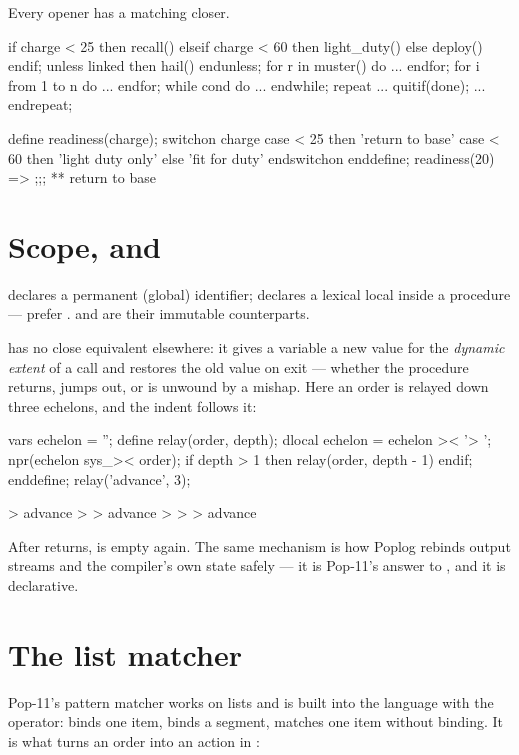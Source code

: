 Every opener has a matching closer.

\begin{pop}
if charge < 25 then recall() elseif charge < 60 then light_duty() else deploy() endif;
unless linked then hail() endunless;
for r in muster() do ... endfor;    for i from 1 to n do ... endfor;
while cond do ... endwhile;         repeat ... quitif(done); ... endrepeat;

define readiness(charge);
    switchon charge
        case < 25 then 'return to base'
        case < 60 then 'light duty only'
        else 'fit for duty'
    endswitchon
enddefine;
readiness(20) =>                    ;;; ** return to base
\end{pop}

\section{Scope, and }

 declares a permanent (global) identifier;  declares a
lexical local inside a procedure --- prefer .  and
 are their immutable counterparts.

 has no close equivalent elsewhere: it gives a variable a new
value for the \emph{dynamic extent} of a call and restores the old value on
exit --- whether the procedure returns, jumps out, or is unwound by a mishap.
Here an order is relayed down three echelons, and the indent follows it:

\begin{pop}
vars echelon = '';
define relay(order, depth);
    dlocal echelon = echelon >< '> ';
    npr(echelon sys_>< order);
    if depth > 1 then relay(order, depth - 1) endif;
enddefine;
relay('advance', 3);
\end{pop}
\begin{repl}
> advance
> > advance
> > > advance
\end{repl}

After  returns,  is empty again. The same mechanism
is how Poplog rebinds output streams and the compiler's own state safely ---
it is Pop-11's answer to , and it is declarative.

\section{The list matcher}

Pop-11's pattern matcher works on lists and is built into the language with
the  operator:  binds one item,  binds a
segment, \code{=} matches one item without binding. It is what turns an
order into an action in :

